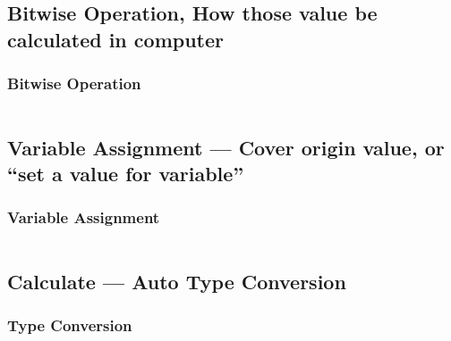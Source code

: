 \documentclass[
  11pt, %
  xcolor=dvipsnames
]{beamer}
\begin{document}
\subsection{Bitwise Operation, How those value be calculated in computer}
\begin{frame}[fragile]
	\frametitle{Bitwise Operation}


	\begin{columns}[c]
		\begin{column}{0.9\textwidth}


		\end{column}
	\end{columns}

\end{frame}


\subsection{Variable Assignment --- Cover origin value, or ``set a value for variable''}
\begin{frame}[fragile]
	\frametitle{Variable Assignment}


	\begin{columns}[c]
		\begin{column}{0.9\textwidth}


		\end{column}
	\end{columns}

\end{frame}

\subsection{Calculate --- Auto Type Conversion}
\begin{frame}[fragile]
	\frametitle{Type Conversion}


	\begin{columns}[c]
		\begin{column}{0.9\textwidth}


		\end{column}
	\end{columns}

\end{frame}
\end{document}
